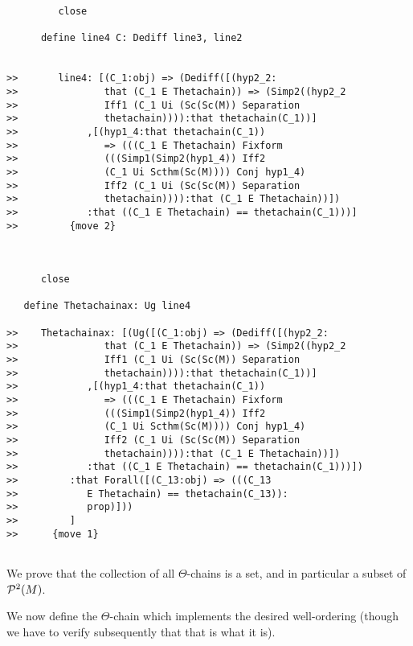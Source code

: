 \documentclass[12pt]{article}
\begin{document}
\begin{verbatim}
         close

      define line4 C: Dediff line3, line2


>>       line4: [(C_1:obj) => (Dediff([(hyp2_2:
>>               that (C_1 E Thetachain)) => (Simp2((hyp2_2
>>               Iff1 (C_1 Ui (Sc(Sc(M)) Separation
>>               thetachain)))):that thetachain(C_1))]
>>            ,[(hyp1_4:that thetachain(C_1))
>>               => (((C_1 E Thetachain) Fixform
>>               (((Simp1(Simp2(hyp1_4)) Iff2
>>               (C_1 Ui Scthm(Sc(M)))) Conj hyp1_4)
>>               Iff2 (C_1 Ui (Sc(Sc(M)) Separation
>>               thetachain)))):that (C_1 E Thetachain))])
>>            :that ((C_1 E Thetachain) == thetachain(C_1)))]
>>         {move 2}



      close

   define Thetachainax: Ug line4

>>    Thetachainax: [(Ug([(C_1:obj) => (Dediff([(hyp2_2:
>>               that (C_1 E Thetachain)) => (Simp2((hyp2_2
>>               Iff1 (C_1 Ui (Sc(Sc(M)) Separation
>>               thetachain)))):that thetachain(C_1))]
>>            ,[(hyp1_4:that thetachain(C_1))
>>               => (((C_1 E Thetachain) Fixform
>>               (((Simp1(Simp2(hyp1_4)) Iff2
>>               (C_1 Ui Scthm(Sc(M)))) Conj hyp1_4)
>>               Iff2 (C_1 Ui (Sc(Sc(M)) Separation
>>               thetachain)))):that (C_1 E Thetachain))])
>>            :that ((C_1 E Thetachain) == thetachain(C_1)))])
>>         :that Forall([(C_13:obj) => (((C_13
>>            E Thetachain) == thetachain(C_13)):
>>            prop)]))
>>         ]
>>      {move 1}


\end{verbatim}

We prove that the collection of all $\Theta$-chains is a set, and in particular a subset of ${\cal P}^2(M)$.

We now define the $\Theta$-chain which implements the desired well-ordering (though we have to verify subsequently that that is what it is).
\end{document}
